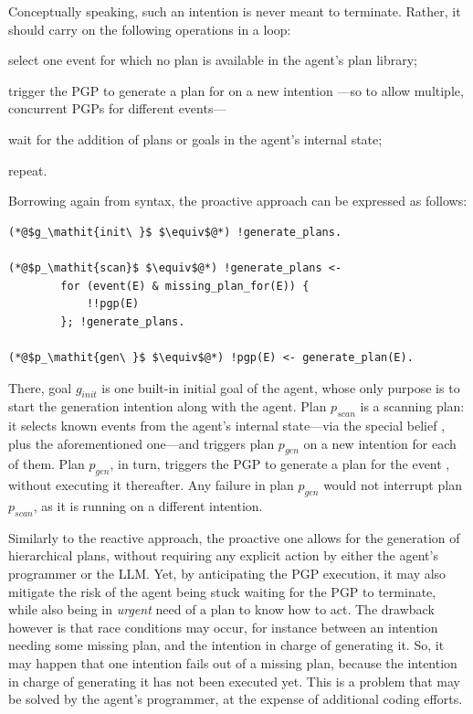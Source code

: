 \documentclass[12pt,a4paper,openright,twoside]{book}
\begin{document}
Conceptually speaking, such an intention is never meant to terminate.
%
Rather, it should carry on the following operations in a loop:
%
\begin{inlinelist}
    \item select one event  for which no plan is available in the agent's plan library;
    \item trigger the \ac{PGP} to generate a plan for  on a new intention
   ---so to allow multiple, concurrent \acp{PGP} for different events---
    \item wait for the addition of plans or goals in the agent's internal state;
    \item repeat.
\end{inlinelist}
%
Borrowing again from \jason{} syntax, the proactive approach can be expressed as follows:
%
\begin{lstlisting}
(*@$g_\mathit{init\ }$ $\equiv$@*) !generate_plans.

(*@$p_\mathit{scan}$ $\equiv$@*) !generate_plans <-
        for (event(E) & missing_plan_for(E)) {
            !!pgp(E)
        }; !generate_plans.

(*@$p_\mathit{gen\ }$ $\equiv$@*) !pgp(E) <- generate_plan(E).
\end{lstlisting}
%
There, goal $g_\mathit{init}$ is one built-in initial goal of the agent, whose only purpose is to start the generation intention along with the agent.
%
Plan $p_\mathit{scan}$ is a scanning plan: it selects known events from the agent's internal state---via the special belief , plus the aforementioned  one---and triggers plan $p_\mathit{gen}$ on a new intention for each of them.
%
Plan $p_\mathit{gen}$, in turn, triggers the \ac{PGP} to generate a plan for the event , without executing it thereafter.
%
Any failure in plan $p_\mathit{gen}$ would not interrupt plan $p_\mathit{scan}$, as it is running on a different intention.

Similarly to the reactive approach, the proactive one allows for the generation of hierarchical plans, without requiring any explicit action by either the agent's programmer or the \ac{LLM}.
%
Yet, by anticipating the \ac{PGP} execution, it may also mitigate the risk of the agent being stuck waiting for the \ac{PGP} to terminate, while also being in \emph{urgent} need of a plan to know how to act.
%
The drawback however is that race conditions may occur, for instance between an intention needing some missing plan, and the intention in charge of generating it.
%
So, it may happen that one intention fails out of a missing plan, because the intention in charge of generating it has not been executed yet.
%
This is a problem that may be solved by the agent's programmer, at the expense of additional coding efforts.
\end{document}
